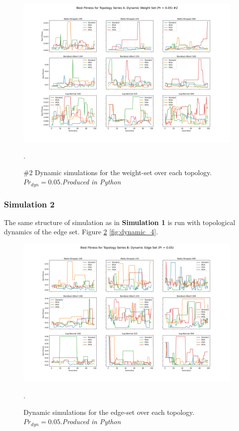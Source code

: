 \documentclass[
	a4paper, %
	10pt, %
	unnumberedsections, %
	twoside, %
]{LTJournalArticle}
\begin{document}
\begin{figure}
	\includegraphics[width=\linewidth]{Figures/sims/dynamic/series_a_weight_2.jpg}
	\caption{\#2 Dynamic simulations for the weight-set over each topology. \(Pr_{dyn} = 0.05\).\emph{Produced in Python}}. 
	\label{fig:dynamic_2}
\end{figure}

\subsubsection{Simulation 2} The same structure of simulation as in \textbf{Simulation 1} is run with topological dynamics of the edge set. Figure \ref{fig:dynamic_3} \ref{fig:dynamic_4}. 

\begin{figure}
	\includegraphics[width=\linewidth]{Figures/sims/dynamic/series_b_edge.jpg}
	\caption{Dynamic simulations for the edge-set over each topology. \(Pr_{dyn} = 0.05\).\emph{Produced in Python}}. 
	\label{fig:dynamic_3}
\end{figure}
\end{document}
